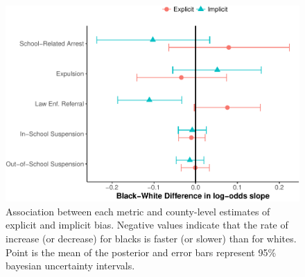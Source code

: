\documentclass[9pt,twocolumn,twoside,lineno]{pnas-new}
\begin{document}
\begin{figure}
\centering
\includegraphics{Riddle_Sinclair_PNAS_files/figure-latex/overall-associations-sex-1.pdf}
\caption{Association between each metric and county-level estimates of
explicit and implicit bias. Negative values indicate that the rate of
increase (or decrease) for blacks is faster (or slower) than for whites.
Point is the mean of the posterior and error bars represent 95\%
bayesian uncertainty intervals.}
\end{figure}
\end{document}
